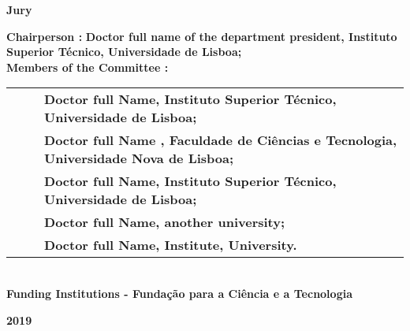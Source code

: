 \begin{flushleft}
    \vspace{8mm}
    \Large \textbf{Jury}\\
    \vspace{2mm}
    \raggedright\Large \textbf{Chairperson :}  \textbf{Doctor full name of the department president, Instituto Superior Técnico, Universidade de Lisboa;}\\
    \Large \textbf{Members of the Committee :}\\ %
    \vspace{2mm}
    \begin{minipage}{\textwidth}
        \begin{tabularx}{1.1\textwidth}{ l @{ } p{} }
            ~~~ & \textbf{Doctor full Name, Instituto Superior Técnico, Universidade de Lisboa;}                  \\
                & \textbf{Doctor full Name    , Faculdade de Ciências e Tecnologia, Universidade Nova de Lisboa;} \\
                & \textbf{Doctor full Name, Instituto Superior Técnico, Universidade de Lisboa;}                  \\
                & \textbf{Doctor full Name, another university;}                                                  \\
                & \textbf{Doctor full Name, Institute, University.}                                               \\
        \end{tabularx}
    \end{minipage}\\
    \centering
    \vspace{5mm}\Large \textbf{Funding Institutions - Fundação para a Ciência e a Tecnologia}\\
    \vspace{10mm}

    \Large \textbf{2019} \\
    \let\thepage\relax
\end{flushleft}
\pagebreak
